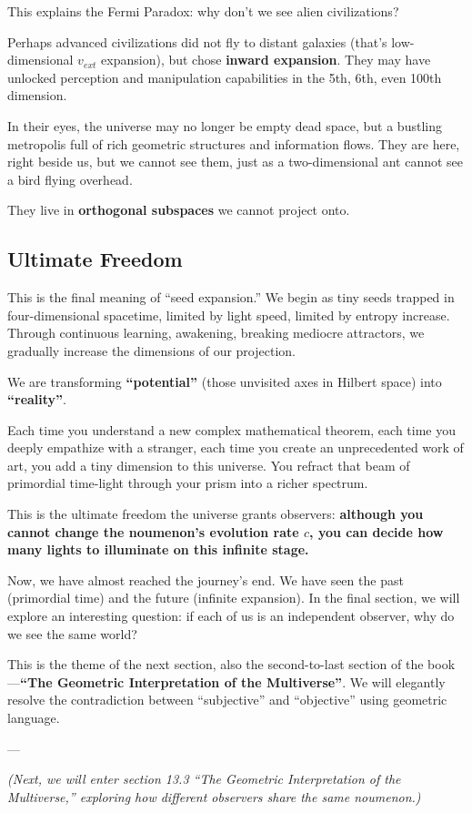 This explains the Fermi Paradox: why don't we see alien civilizations?

Perhaps advanced civilizations did not fly to distant galaxies (that's low-dimensional $v_{ext}$ expansion), but chose \textbf{inward expansion}. They may have unlocked perception and manipulation capabilities in the 5th, 6th, even 100th dimension.

In their eyes, the universe may no longer be empty dead space, but a bustling metropolis full of rich geometric structures and information flows. They are here, right beside us, but we cannot see them, just as a two-dimensional ant cannot see a bird flying overhead.

They live in \textbf{orthogonal subspaces} we cannot project onto.

\subsection{Ultimate Freedom}

This is the final meaning of ``seed expansion.'' We begin as tiny seeds trapped in four-dimensional spacetime, limited by light speed, limited by entropy increase. Through continuous learning, awakening, breaking mediocre attractors, we gradually increase the dimensions of our projection.

We are transforming \textbf{``potential''} (those unvisited axes in Hilbert space) into \textbf{``reality''}.

Each time you understand a new complex mathematical theorem, each time you deeply empathize with a stranger, each time you create an unprecedented work of art, you add a tiny dimension to this universe. You refract that beam of primordial time-light through your prism into a richer spectrum.

This is the ultimate freedom the universe grants observers: \textbf{although you cannot change the noumenon's evolution rate $c$, you can decide how many lights to illuminate on this infinite stage.}

Now, we have almost reached the journey's end. We have seen the past (primordial time) and the future (infinite expansion). In the final section, we will explore an interesting question: if each of us is an independent observer, why do we see the same world?

This is the theme of the next section, also the second-to-last section of the book---\textbf{``The Geometric Interpretation of the Multiverse''}. We will elegantly resolve the contradiction between ``subjective'' and ``objective'' using geometric language.

---

\textit{(Next, we will enter section 13.3 ``The Geometric Interpretation of the Multiverse,'' exploring how different observers share the same noumenon.)}

